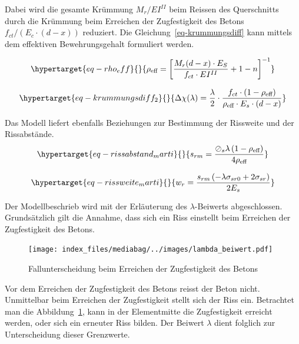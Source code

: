 \documentclass[
  12pt,
  letterpaper,
  egregdoesnotlikesansseriftitles]{scrreprt}
\begin{document}
Dabei wird die gesamte Krümmung \(M_r/EI^{II}\) beim Reissen des
Querschnitts durch die Krümmung beim Erreichen der Zugfestigkeit des
Betons \(f_{ct}/(E_c\cdot(d-x))\) reduziert. Die
Gleichung~\ref{eq-krummungsdiff} kann mittels dem effektiven
Bewehrungsgehalt formuliert werden.

\begin{equation}\protect\hypertarget{eq-rho_eff}{}{
\rho_{\text{eff}} = \left [\frac{M_r(d-x)\cdot E_S}{f_{ct}\cdot EI^{II}}+1-n \right ]^{-1}
}\label{eq-rho_eff}\end{equation}

\begin{equation}\protect\hypertarget{eq-krummungsdiff_2}{}{
\Delta \chi(\lambda) = \frac{\lambda}{2} \cdot \frac{f_{ct} \cdot (1-\rho_{\text{eff}})}{\rho_{\text{eff}} \cdot E_s \cdot (d-x)}
}\label{eq-krummungsdiff_2}\end{equation}

Das Modell liefert ebenfalls Beziehungen zur Bestimmung der Rissweite
und der Rissabstände.
\begin{equation}\protect\hypertarget{eq-rissabstand_marti}{}{
s_{rm} = \frac{\oslash_{s} \lambda \left(1 - \rho_{\text{eff}}\right)}{4 \rho_{\text{eff}}}
}\label{eq-rissabstand_marti}\end{equation}

\begin{equation}\protect\hypertarget{eq-rissweite_marti}{}{
w_{r} = \frac{s_{rm} \left(- \lambda \sigma_{sr0} + 2 \sigma_{sr}\right)}{2 E_{s}}
}\label{eq-rissweite_marti}\end{equation}

Der Modellbeschrieb wird mit der Erläuterung des \(\lambda\)-Beiwerts
abgeschlossen. Grundsätzlich gilt die Annahme, dass sich ein Riss
einstellt beim Erreichen der Zugfestigkeit des Betons.

\begin{figure}[H]

{\centering \texttt{[image: index\_files/mediabag/../images/lambda\_beiwert.pdf]}

}

\caption{\label{fig-fallunterscheidung_lambda_riss}Fallunterscheidung
beim Erreichen der Zugfestigkeit des Betons}

\end{figure}

Vor dem Erreichen der Zugfestigkeit des Betons reisst der Beton nicht.
Unmittelbar beim Erreichen der Zugfestigkeit stellt sich der Riss ein.
Betrachtet man die Abbildung~\ref{fig-fallunterscheidung_lambda_riss},
kann in der Elementmitte die Zugfestigkeit erreicht werden, oder sich
ein erneuter Riss bilden. Der Beiwert \(\lambda\) dient folglich zur
Unterscheidung dieser Grenzwerte.
\end{document}
